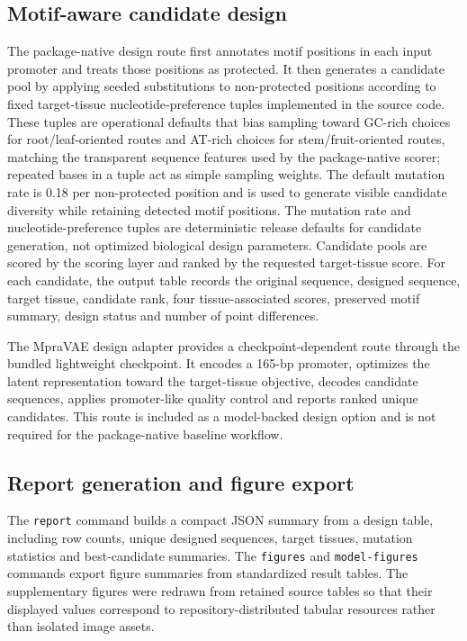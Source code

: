 \documentclass[10pt]{article}
\begin{document}
\subsection{Motif-aware candidate design}

The package-native design route first annotates motif positions in each input promoter and treats those positions as protected. It then generates a candidate pool by applying seeded substitutions to non-protected positions according to fixed target-tissue nucleotide-preference tuples implemented in the source code. These tuples are operational defaults that bias sampling toward GC-rich choices for root/leaf-oriented routes and AT-rich choices for stem/fruit-oriented routes, matching the transparent sequence features used by the package-native scorer; repeated bases in a tuple act as simple sampling weights. The default mutation rate is 0.18 per non-protected position and is used to generate visible candidate diversity while retaining detected motif positions. The mutation rate and nucleotide-preference tuples are deterministic release defaults for candidate generation, not optimized biological design parameters. Candidate pools are scored by the scoring layer and ranked by the requested target-tissue score. For each candidate, the output table records the original sequence, designed sequence, target tissue, candidate rank, four tissue-associated scores, preserved motif summary, design status and number of point differences.

The MpraVAE design adapter provides a checkpoint-dependent route through the bundled lightweight checkpoint. It encodes a 165-bp promoter, optimizes the latent representation toward the target-tissue objective, decodes candidate sequences, applies promoter-like quality control and reports ranked unique candidates. This route is included as a model-backed design option and is not required for the package-native baseline workflow.

\subsection{Report generation and figure export}

The \texttt{report} command builds a compact JSON summary from a design table, including row counts, unique designed sequences, target tissues, mutation statistics and best-candidate summaries. The \texttt{figures} and \texttt{model-figures} commands export figure summaries from standardized result tables. The supplementary figures were redrawn from retained source tables so that their displayed values correspond to repository-distributed tabular resources rather than isolated image assets.
\end{document}
